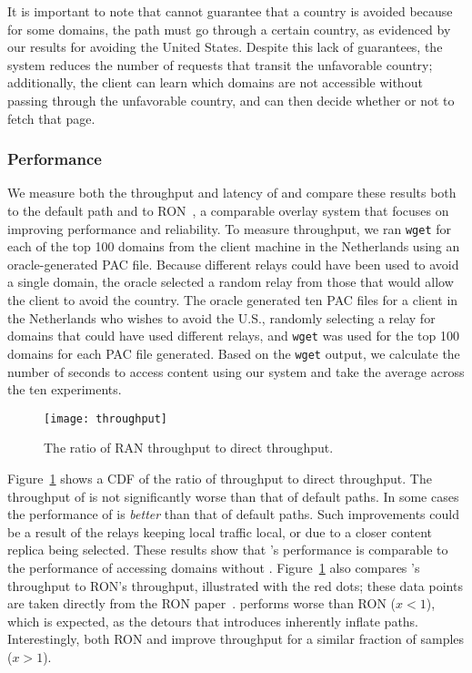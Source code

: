 It is important to note that \system{} cannot guarantee that a country is 
avoided because for some domains, the path must go through a certain 
country, as evidenced by our results for avoiding the United States.  Despite 
this lack of guarantees, the system reduces the number of requests that 
transit the unfavorable country; additionally, the client can learn which domains 
are not accessible without passing through the unfavorable country, and can then 
decide whether or not to fetch that page.  

\subsubsection{Performance}
We measure both 
the throughput and latency of \system{} and compare these results both to the default
path and to RON~\cite{andersen2001resilient}, a comparable overlay system that focuses
on improving performance and reliability.
To measure throughput, we ran {\tt wget} for each 
of the top 100 domains from the client machine in the Netherlands 
using an oracle-generated PAC file.  Because different relays could have been 
used to avoid a single domain, the oracle selected a random relay from those 
that would allow the client to avoid the country.  The oracle generated 
ten PAC files for a client in the Netherlands who wishes to avoid the U.S.,
 randomly selecting a relay for domains that could have used 
different relays, and {\tt wget} was used for the top 100 domains for each 
PAC file generated.  Based on the {\tt wget} output, we calculate the number 
of seconds to access content using our system and take the average across the 
ten experiments. 

\begin{figure}[t]
\centering
\texttt{[image: throughput]}
\caption{The ratio of RAN throughput to direct throughput. } 
\label{fig:throughput}
\end{figure}

Figure~\ref{fig:throughput} shows a CDF of the ratio of \system{}
throughput to direct throughput.  The throughput of
\system{} is not significantly worse than that of default paths.  
In some cases the performance of \system{} is {\it better} than
that of default paths.  Such improvements could be a result of the
relays keeping local traffic local, or due to a closer content replica
being selected.  These results show that \system{}'s performance is
comparable to the performance of accessing domains without \system{}.
Figure~\ref{fig:throughput} also compares \system{}'s throughput to
RON's throughput, illustrated with the red dots; these data points are taken 
directly from the RON paper~\cite{andersen2001resilient}.  \system{} performs
worse than RON ($x < 1$), which is expected, as the detours that
\system{} introduces inherently inflate paths.  Interestingly, both
RON and \system{} improve throughput for a similar fraction of samples
($x>1$).

